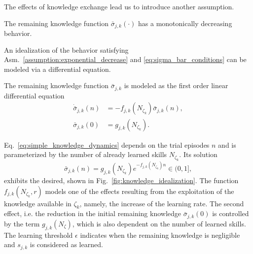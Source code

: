 The effects of knowledge exchange lead us to introduce another assumption.
\begin{tcolorbox}
	\begin{assumption}\label{assumption:exponential_decrease} The remaining knowledge function $\bar{\sigma}_{j,k}(\cdot)$ has a monotonically decreasing behavior.
	\end{assumption}
\end{tcolorbox} 
\noindent

An idealization of the behavior satisfying Asm.~\ref{assumption:exponential_decrease} and \eqref{eq:sigma_bar_conditions} can be modeled via a differential equation.
\begin{tcolorbox}
	\begin{definition}\label{assumption:ode_model}
		The remaining knowledge function $\bar{\sigma}_{j,k}$ is modeled as the first order linear differential equation
		\begin{subequations}\label{eq:simple_knowledge_dynamics}
			\begin{alignat}{2}
				\dot{\bar{\sigma}}_{j,k}\left(n\right) &= -f_{j,k} \left(N_{\zeta_k} \right) \bar{\sigma}_{j,k}\left(n\right),\\
				\bar{\sigma}_{j,k}(0) &= g_{j,k} \left(N_{\zeta_k}\right).
			\end{alignat}
		\end{subequations}
	\end{definition}
\end{tcolorbox} 
Eq.~\eqref{eq:simple_knowledge_dynamics} depends on the trial episodes $n$ and is parameterized by the number of already learned skills $N_{\zeta_k}$. Its solution
\begin{equation}\label{eq:knowledge_exponential_form}
	\boxed{\bar{\sigma}_{j,k}(n) = g_{j,k}\left(N_{\zeta_k}\right) e ^{-f_{j,k}\left(N_{\zeta_k}\right) n} \in (0,1]},
\end{equation}
exhibits the desired, shown in Fig.~\ref{fig:knowledge_idealization}. The function $f_{j,k}\left(N_{\zeta_k}, r\right)$ models one of the effects resulting from the exploitation of the knowledge available in $\zeta_k$, namely, the increase of the learning rate. The second effect, i.e. the reduction in the initial remaining knowledge $\bar{\sigma}_{j,k}(0)$ is controlled by the term $g_{j,k}\left(N_{\zeta}\right)$, which is also dependent on the number of learned skills. The learning threshold $\epsilon$ indicates when the remaining knowledge is negligible and $s_{j,k}$ is considered as learned.
